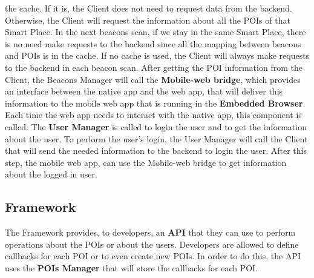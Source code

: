 the cache. If it is, the Client does not need to request
data from the backend. Otherwise, the Client will
request the information about all the POIs of that
Smart Place. In the next beacons scan, if we stay in
the same Smart Place, there is no need make requests
to the backend since all the mapping between beacons
and POIs is in the cache.
If no cache is used, the Client will always make requests
to the backend in each beacon scan.
After getting the POI information from the Client,
the Beacons Manager will call the \textbf{Mobile-web bridge},
which provides an interface between the native app
and the web app, that will deliver this information
to the mobile web app that is running in the
\textbf{Embedded Browser}. 
Each time the web app needs to interact
with the native app, this component is called.
The \textbf{User Manager} is called to login the
user and to get the information about the user. 
To perform the user's login, the User Manager
will call the Client that will send the needed information
to the backend to login the user. After this step,
the mobile web app, can use the Mobile-web bridge
to get information about the logged in user.

\subsection{Framework}
\label{sub:framework}
The Framework provides, to developers, an \textbf{API} that they
can use to perform operations about the POIs or about the users.
Developers are allowed to define callbacks for each POI or to
even create new POIs. In order to do this, the API
uses the \textbf{POIs Manager} that will store the callbacks
for each POI.
